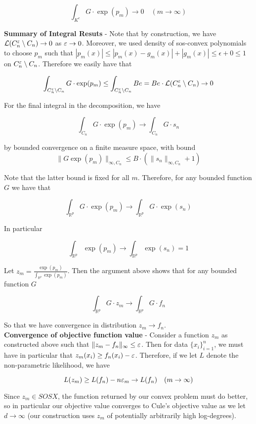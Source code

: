 \documentclass[11pt,reqno]{amsart}
\numberwithin{equation}{section}
\newcommand{\mr}{\mathbb{R}}
\newcommand{\tb}{\textbf}
\newcommand{\mc}{\mathcal}
\begin{document}
\[
\int_{K^c} G \cdot \exp (p_m)  \to 0 \quad (m \to \infty) 
\]

\tb{Summary of Integral Resuts} - Note that by construction, we have $\mc{L}(C_n^{\eps} \setminus C_n) \to 0$ as $\varepsilon \rightarrow 0$. Moreover, we used density of sos-convex polynomials to choose $p_m$ such that $|p_m(x)| \leq |p_m(x) - g_m(x)| + |g_m(x)| \leq \epsilon + 0 \leq 1$ on $C_n^{\varepsilon} \setminus C_n$. Therefore we easily have that 

\[
\int_{C_n^{\eps} \setminus C_n} G \cdot \exp(p_m) \leq \int_{C_n^{\eps} \setminus C_n} Be = Be \cdot \mc{L}(C_n^{\eps} \setminus C_n) \to 0
\]

For the final integral in the decomposition, we have 

\[
\int_{C_n} G \cdot \exp(p_m) \to \int_{C_n} G \cdot s_n
\]

by bounded convergence on a finite measure space, with bound \\

\[
\|G \exp(p_m) \|_{\infty, C_n} \leq B \cdot (\|s_n\|_{\infty, C_n} + 1) 
\]

 Note that the latter bound is fixed for all $m$. Therefore, for any bounded function $G$ we have that 

\[
\int_{\mr^p} G\cdot \exp(p_m) \to \int_{\mr^p} G \cdot \exp(s_n) 
\]

In particular 

\[
\int_{\mr^p} \exp(p_m) \to \int_{\mr^p} \exp(s_n ) = 1
\]

Let $z_m = \frac{\exp(p_m)}{\int_{\mr^p} \exp(p_m)} $. Then the argument above shows that for any bounded function $G$

\[
\int_{\mr^p} G\cdot z_m \to \int_{\mr^p} G \cdot f_n
\]

So that we have convergence in distribution $z_m \to f_n$. \\

\tb{Convergence of objective function value} - Consider a function $z_m$ as constructed above such that $\|z_m - f_n\|_{\infty} \leq \varepsilon$. Then for data $\{x_i\}_{i = 1}^n$, we must have in particular that $z_m(x_i) \geq f_n(x_i) - \varepsilon$. Therefore, if we let $L$ denote the non-parametric likelihood, we have 

\[
L(z_m) \geq L(f_n) - n \varepsilon_m \rightarrow L(f_n) \quad (m \rightarrow \infty) 
\]

Since $z_m \in SOSX$, the function returned by our convex problem must do better, so in particular our objective value converges to Cule's objective value as we let $d \to \infty$ (our construction uses $z_m$ of potentially arbitrarily high log-degrees). \\
\end{document}

